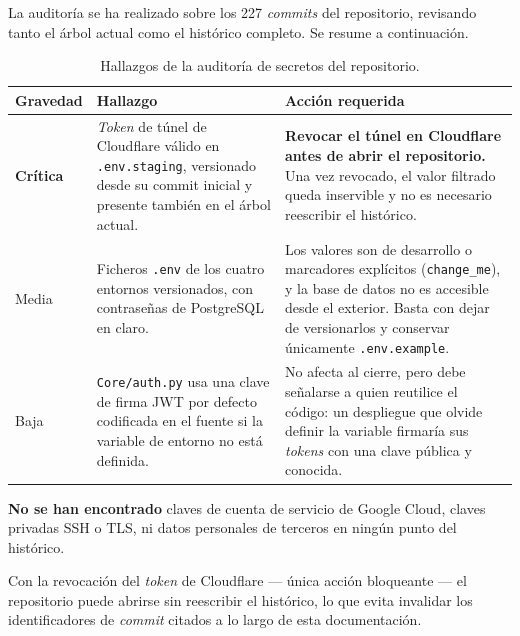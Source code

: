La auditor\'ia se ha realizado sobre los 227 \textit{commits} del
repositorio, revisando tanto el \'arbol actual como el hist\'orico
completo. Se resume a continuaci\'on.

\begin{table}[H]
    \centering
    \caption{Hallazgos de la auditor\'ia de secretos del repositorio.}
    \label{tab:auditoria}
    \begin{tabular}{p{1.8cm}p{4.6cm}p{6.2cm}}
        \toprule
        \textbf{Gravedad} & \textbf{Hallazgo} & \textbf{Acci\'on requerida} \\
        \midrule
        \textbf{Cr\'itica} &
        \textit{Token} de t\'unel de Cloudflare v\'alido en
        \texttt{.env.staging}, versionado desde su commit inicial y
        presente tambi\'en en el \'arbol actual. &
        \textbf{Revocar el t\'unel en Cloudflare antes de abrir el
        repositorio.} Una vez revocado, el valor filtrado queda inservible
        y no es necesario reescribir el hist\'orico. \\
        \midrule
        Media &
        Ficheros \texttt{.env} de los cuatro entornos versionados, con
        contrase\~nas de PostgreSQL en claro. &
        Los valores son de desarrollo o marcadores expl\'icitos
        (\texttt{change\_me}), y la base de datos no es accesible desde
        el exterior. Basta con dejar de versionarlos y conservar
        \'unicamente \texttt{.env.example}. \\
        \midrule
        Baja &
        \texttt{Core/auth.py} usa una clave de firma JWT por defecto
        codificada en el fuente si la variable de entorno no est\'a
        definida. &
        No afecta al cierre, pero debe se\~nalarse a quien reutilice el
        c\'odigo: un despliegue que olvide definir la variable firmar\'ia
        sus \textit{tokens} con una clave p\'ublica y conocida. \\
        \bottomrule
    \end{tabular}
\end{table}

\textbf{No se han encontrado} claves de cuenta de servicio de Google
Cloud, claves privadas SSH o TLS, ni datos personales de terceros en
ning\'un punto del hist\'orico.

Con la revocaci\'on del \textit{token} de Cloudflare --- \'unica acci\'on
bloqueante --- el repositorio puede abrirse sin reescribir el hist\'orico,
lo que evita invalidar los identificadores de \textit{commit} citados a
lo largo de esta documentaci\'on.

